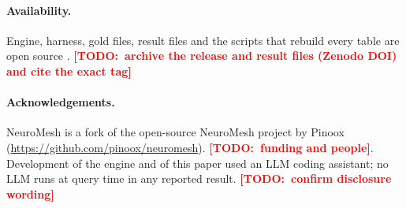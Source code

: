 \documentclass[10pt,twocolumn]{article}
\newcommand{\todo}[1]{\textcolor{red}{\textbf{[TODO:~#1]}}}
\newcommand{\nm}{NeuroMesh}
\begin{document}
\paragraph{Availability.}
Engine, harness, gold files, result files and the scripts that rebuild every table are open source
\citep{neuromesh}. \todo{archive the release and result files (Zenodo DOI) and cite the exact tag}

\paragraph{Acknowledgements.}
\nm{} is a fork of the open-source NeuroMesh project by Pinoox (\url{https://github.com/pinoox/neuromesh}).
\todo{funding and people}. Development of the engine and of this paper used an LLM coding
assistant; no LLM runs at query time in any reported result. \todo{confirm disclosure wording}



\end{document}
